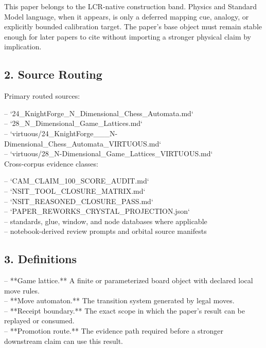 \documentclass[11pt]{article}
\begin{document}
This paper belongs to the LCR-native construction band. Physics and Standard Model language, when it appears, is only a deferred mapping cue, analogy, or explicitly bounded calibration target. The paper's base object must remain stable enough for later papers to cite without importing a stronger physical claim by implication.

\subsection*{2. Source Routing}

Primary routed sources:

\noindent{}-- `24\_KnightForge\_N\_Dimensional\_Chess\_Automata.md`\\
\noindent{}-- `28\_N\_Dimensional\_Game\_Lattices.md`\\
\noindent{}-- `virtuous/24\_KnightForge\_\_\_N-Dimensional\_Chess\_Automata\_VIRTUOUS.md`\\
\noindent{}-- `virtuous/28\_N-Dimensional\_Game\_Lattices\_VIRTUOUS.md`\\

Cross-corpus evidence classes:

\noindent{}-- `CAM\_CLAIM\_100\_SCORE\_AUDIT.md`\\
\noindent{}-- `NSIT\_TOOL\_CLOSURE\_MATRIX.md`\\
\noindent{}-- `NSIT\_REASONED\_CLOSURE\_PASS.md`\\
\noindent{}-- `PAPER\_REWORKS\_CRYSTAL\_PROJECTION.json`\\
\noindent{}-- standards, glue, window, and node databases where applicable\\
\noindent{}-- notebook-derived review prompts and orbital source manifests\\

\subsection*{3. Definitions}

\noindent{}-- **Game lattice.** A finite or parameterized board object with declared local move rules.\\
\noindent{}-- **Move automaton.** The transition system generated by legal moves.\\
\noindent{}-- **Receipt boundary.** The exact scope in which the paper's result can be replayed or consumed.\\
\noindent{}-- **Promotion route.** The evidence path required before a stronger downstream claim can use this result.\\
\end{document}
